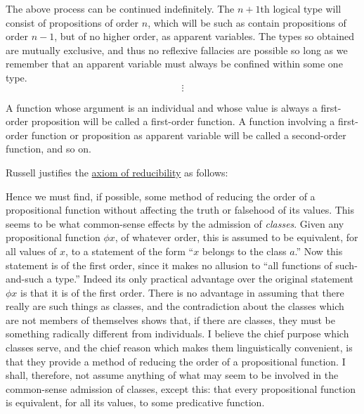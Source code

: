 \begin{remark}
\begin{thmenum}
\begin{displayquote}
      The above process can be continued indefinitely. The \( n + 1 \)th logical type will consist of propositions of order \( n \), which will be such as contain propositions of order \( n - 1 \), but of no higher order, as apparent variables. The types so obtained are mutually exclusive, and thus no reflexive fallacies are possible so long as we remember that an apparent variable must always be confined within some one type.
      \begin{equation*}
        \vdots
      \end{equation*}

      A function whose argument is an individual and whose value is always a first-order proposition will be called a first-order function. A function involving a first-order function or proposition as apparent variable will be called a second-order function, and so on.
    \end{displayquote}

     Russell justifies the \hyperref[def:ramified_theory_of_types/reducibility]{axiom of reducibility} as follows:
    \begin{displayquote}
      Hence we must find, if possible, some method of reducing the order of a propositional function without affecting the truth or falsehood of its values. This seems to be what common-sense effects by the admission of \textit{classes}. Given any propositional function \( \phi x \), of whatever order, this is assumed to be equivalent, for all values of \( x \), to a statement of the form \enquote{\( x \) belongs to the class \( a \).} Now this statement is of the first order, since it makes no allusion to \enquote{all functions of such-and-such a type.} Indeed its only practical advantage over the original statement \( \phi x \) is that it is of the first order. There is no advantage in assuming that there really are such things as classes, and the contradiction about the classes which are not members of themselves shows that, if there are classes, they must be something radically different from individuals. I believe the chief purpose which classes serve, and the chief reason which makes them linguistically convenient, is that they provide a method of reducing the order of a propositional function. I shall, therefore, not assume anything of what may seem to be involved in the common-sense admission of classes, except this: that every propositional function is equivalent, for all its values, to some predicative function.
    \end{displayquote}


\end{thmenum}
\end{remark}
